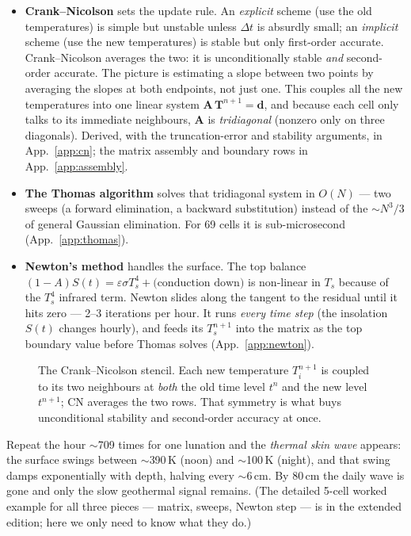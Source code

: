 \documentclass[11pt]{report}
\begin{document}
\begin{itemize}[leftmargin=1.4em,itemsep=3pt]
\item \textbf{Crank--Nicolson} sets the update rule. An \emph{explicit} scheme
  (use the old temperatures) is simple but unstable unless $\Delta t$ is
  absurdly small; an \emph{implicit} scheme (use the new temperatures) is stable
  but only first-order accurate. Crank--Nicolson averages the two: it is
  unconditionally stable \emph{and} second-order accurate. The picture is
  estimating a slope between two points by averaging the slopes at both
  endpoints, not just one. This couples all the new temperatures into one linear
  system $\mathbf{A}\,\mathbf{T}^{n+1}=\mathbf{d}$, and because each cell only
  talks to its immediate neighbours, $\mathbf{A}$ is \emph{tridiagonal} (nonzero
  only on three diagonals). Derived, with the truncation-error and stability
  arguments, in App.~\ref{app:cn}; the matrix assembly and boundary rows in
  App.~\ref{app:assembly}.
\item \textbf{The Thomas algorithm} solves that tridiagonal system in $O(N)$
  --- two sweeps (a forward elimination, a backward substitution) instead of the
  $\sim N^3/3$ of general Gaussian elimination. For 69 cells it is
  sub-microsecond (App.~\ref{app:thomas}).
\item \textbf{Newton's method} handles the surface. The top balance
  $(1-A)S(t)=\varepsilon\sigma T_s^4 + \text{(conduction down)}$ is non-linear in
  $T_s$ because of the $T_s^4$ infrared term. Newton slides along the tangent to
  the residual until it hits zero --- 2--3 iterations per hour. It runs
  \emph{every time step} (the insolation $S(t)$ changes hourly), and feeds its
  $T_s^{n+1}$ into the matrix as the top boundary value before Thomas solves
  (App.~\ref{app:newton}).
\end{itemize}

\begin{figure}[htbp]\centering

\caption{The Crank--Nicolson stencil. Each new temperature $T_i^{n+1}$ is coupled
to its two neighbours at \emph{both} the old time level $t^n$ and the new level
$t^{n+1}$; CN averages the two rows. That symmetry is what buys unconditional
stability and second-order accuracy at once.}
\label{fig:cnstencil}
\end{figure}

\noindent Repeat the hour $\sim$709 times for one lunation and the \emph{thermal
skin wave} appears: the surface swings between $\sim$390\,K (noon) and
$\sim$100\,K (night), and that swing damps exponentially with depth, halving
every $\sim$6\,cm. By 80\,cm the daily wave is gone and only the slow geothermal
signal remains. (The detailed 5-cell worked example for all three pieces ---
matrix, sweeps, Newton step --- is in the extended edition; here we only need to
know what they do.)
\end{document}
